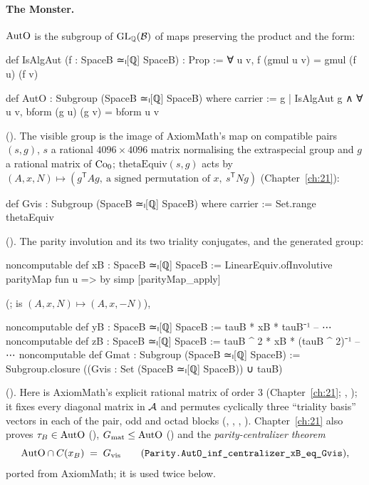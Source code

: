 \paragraph{The Monster.}  $\mathrm{AutO}$ is the subgroup of $\mathrm{GL}_{\mathbb{Q}}(\mathcal{B})$ of maps preserving
the product and the form:
\begin{leancode}
def IsAlgAut (f : SpaceB ≃ₗ[ℚ] SpaceB) : Prop := ∀ u v, f (gmul u v) = gmul (f u) (f v)
\end{leancode}
\begin{leancode}
def AutO : Subgroup (SpaceB ≃ₗ[ℚ] SpaceB) where
  carrier := {g | IsAlgAut g ∧ ∀ u v, bform (g u) (g v) = bform u v}
\end{leancode}
().  The visible group is the image of AxiomMath's map
 on compatible pairs $(s,g)$, $s$ a rational $4096\times4096$ matrix normalising the extraspecial
group and $g$ a rational matrix of $\mathrm{Co}_0$; $\mathrm{thetaEquiv}(s,g)$ acts by
$(A,x,N)\mapsto(g^{\mathsf T}Ag,\ \text{a signed permutation of }x,\ s^{\mathsf T}Ng)$ (Chapter~\ref{ch:21}):
\begin{leancode}
def Gvis : Subgroup (SpaceB ≃ₗ[ℚ] SpaceB) where
  carrier := Set.range thetaEquiv
\end{leancode}
().  The parity involution and its two triality conjugates,
and the generated group:
\begin{leancode}
noncomputable def xB : SpaceB ≃ₗ[ℚ] SpaceB :=
  LinearEquiv.ofInvolutive parityMap fun u => by simp [parityMap_apply]
\end{leancode}
(;  is $(A,x,N)\mapsto(A,x,-N)$),
\begin{leancode}
noncomputable def yB : SpaceB ≃ₗ[ℚ] SpaceB := tauB * xB * tauB⁻¹
-- ⋯
noncomputable def zB : SpaceB ≃ₗ[ℚ] SpaceB := tauB ^ 2 * xB * (tauB ^ 2)⁻¹
-- ⋯
noncomputable def Gmat : Subgroup (SpaceB ≃ₗ[ℚ] SpaceB) :=
  Subgroup.closure ((Gvis : Set (SpaceB ≃ₗ[ℚ] SpaceB)) ∪ {tauB})
\end{leancode}
().  Here  is AxiomMath's explicit rational
matrix of order $3$ (Chapter~\ref{ch:21}; , ); it fixes every
diagonal matrix in $\mathcal{A}$ and permutes cyclically three ``triality basis'' vectors in each of the pair, odd and
octad blocks (, , , ).  Chapter~\ref{ch:21} also proves
$\tau_B\in\mathrm{AutO}$ (), $G_{\mathrm{mat}}\le\mathrm{AutO}$ () and the
\emph{parity-centralizer theorem}
\begin{equation}\label{ch22:eq:parity}
  \chtwentytwoAutO\cap C(x_B)\;=\;\chtwentytwoGvis
  \qquad(\text{\lean{Parity.AutO_inf_centralizer_xB_eq_Gvis}}),
\end{equation}
ported from AxiomMath; it is used twice below.

